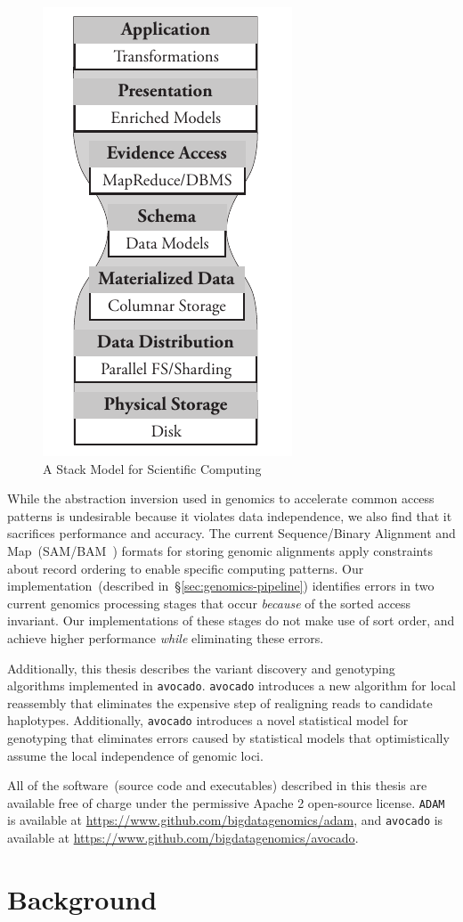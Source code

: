 \documentclass[masters]{ucbthesis}
\begin{document}
\begin{figure}[h]
\begin{center}
\includegraphics[width=0.25\linewidth]{stack-model.pdf}
\end{center}
\caption{A Stack Model for Scientific Computing}
\label{fig:stack-model}
\end{figure}

While the abstraction inversion used in genomics to accelerate common access patterns is undesirable
because it violates data independence, we also find that it sacrifices performance and
accuracy. The current Sequence/Binary Alignment and Map~(SAM/BAM~\cite{li09}) formats for storing
genomic alignments apply constraints about record ordering to enable specific computing patterns. Our
implementation~(described in~\S\ref{sec:genomics-pipeline}) identifies errors in two current genomics
processing stages that occur \emph{because} of the sorted access invariant. Our implementations of
these stages do not make use of sort order, and achieve higher performance \emph{while} eliminating
these errors.

Additionally, this thesis describes the variant discovery and genotyping algorithms implemented in
\texttt{avocado}. \texttt{avocado} introduces a new algorithm for local reassembly that eliminates the
expensive step of realigning reads to candidate haplotypes. Additionally, \texttt{avocado} introduces
a novel statistical model for genotyping that eliminates errors caused by statistical models that
optimistically assume the local independence of genomic loci.

All of the software~(source code and executables) described in this thesis are available free of charge
under the permissive Apache 2 open-source license. \texttt{ADAM} is available at
\url{https://www.github.com/bigdatagenomics/adam}, and \texttt{avocado} is available at
\url{https://www.github.com/bigdatagenomics/avocado}.

\section{Background}
\label{sec:background}
\end{document}

